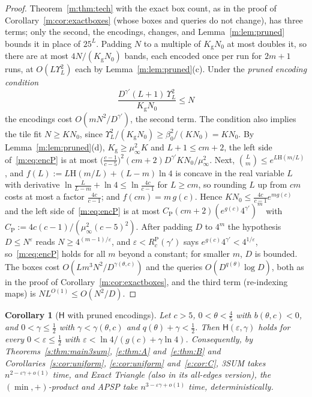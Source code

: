 \documentclass[11pt]{article}
\newtheorem{corollary}[theorem]{Corollary}
\theoremstyle{definition}
\theoremstyle{remark}
\newcommand{\Hh}{\mathrm{H}}
\newcommand{\Nz}{N_0}
\newcommand{\Kg}{K_{\mathrm g}}
\newcommand{\Hyp}{\mathsf{H}}
\begin{document}
\begin{proof}
Theorem~\ref{m:thm:tech} with the exact box count, as in the proof of Corollary~\ref{m:cor:exactboxes} (whose boxes and queries do not change), has three terms; only the second, the encodings, changes, and Lemma~\ref{m:lem:pruned} bounds it in place of $25^L$. Padding $N$ to a multiple of $\Kg\Nz$ at most doubles it, so there are at most $4N/(\Kg\Nz)$ bands, each encoded once per run for $2m+1$ runs, at $O(L\Upsilon_L^2)$ each by Lemma~\ref{m:lem:pruned}(c). Under the \emph{pruned encoding condition}
\begin{equation}\label{m:eq:encP}
\frac{D^{\gamma'}(L+1)\,\Upsilon_L^2}{\Kg\Nz}\le N
\end{equation}
the encodings cost $O(mN^2/D^{\gamma'})$, the second term. The condition also implies the tile fit $N\ge K\Nz$, since $\Upsilon_L^2/(\Kg\Nz)\ge\beta_0^2/(K\Nz)=K\Nz$. By Lemma~\ref{m:lem:pruned}(d), $\Kg\ge\mu_\infty^2K$ and $L+1\le cm+2$, the left side of~\eqref{m:eq:encP} is at most $\big(\frac{c-1}{c-5}\big)^2(cm+2)D^{\gamma'}K\Nz/\mu_\infty^2$. Next, $\binom Lm\le e^{L\Hh(m/L)}$, and $f(L):=L\Hh(m/L)+(L-m)\ln4$ is concave in the real variable $L$ with derivative $\ln\frac L{L-m}+\ln4\le\ln\frac{4c}{c-1}$ for $L\ge cm$, so rounding $L$ up from $cm$ costs at most a factor $\frac{4c}{c-1}$; and $f(cm)=m\,g(c)$. Hence $K\Nz\le\frac{4c}{c-1}e^{mg(c)}$ and the left side of~\eqref{m:eq:encP} is at most $C_{\mathrm P}(cm+2)(e^{g(c)}4^{\gamma'})^m$ with $C_{\mathrm P}:=4c(c-1)/(\mu_\infty^2(c-5)^2)$. After padding $D$ to $4^m$ the hypothesis $D\le N^\varepsilon$ reads $N\ge4^{(m-1)/\varepsilon}$, and $\varepsilon<R^{\mathrm P}_c(\gamma')$ says $e^{g(c)}4^{\gamma'}<4^{1/\varepsilon}$, so~\eqref{m:eq:encP} holds for all $m$ beyond a constant; for smaller $m$, $D$ is bounded. The boxes cost $O(Lm^3N^2/D^{\gamma(\theta,c)})$ and the queries $O(D^{q(\theta)}\log D)$, both as in the proof of Corollary~\ref{m:cor:exactboxes}, and the third term (re-indexing maps) is $NL^{O(1)}\le O(N^2/D)$.
\end{proof}

\begin{corollary}[$\Hyp$ with pruned encodings]\label{m:cor:pruned}
Let $c>5$, $0<\theta<\frac45$ with $b(\theta,c)<0$, and $0<\gamma\le\frac12$ with $\gamma<\gamma(\theta,c)$ and $q(\theta)+\gamma<\frac12$. Then $\Hyp(\varepsilon,\gamma)$ holds for every $0<\varepsilon\le\frac12$ with $\varepsilon<\ln4/(g(c)+\gamma\ln4)$. Consequently, by Theorems~\ref{s:thm:main3sum}, \ref{e:thm:A} and~\ref{e:thm:B} and Corollaries~\ref{s:cor:uniform}, \ref{e:cor:uniform} and~\ref{e:cor:C}, 3SUM takes $n^{2-\varepsilon\gamma+o(1)}$ time, and Exact Triangle (also in its all-edges version), the $(\min,+)$-product and APSP take $n^{3-\varepsilon\gamma+o(1)}$ time, deterministically.
\end{corollary}
\end{document}
